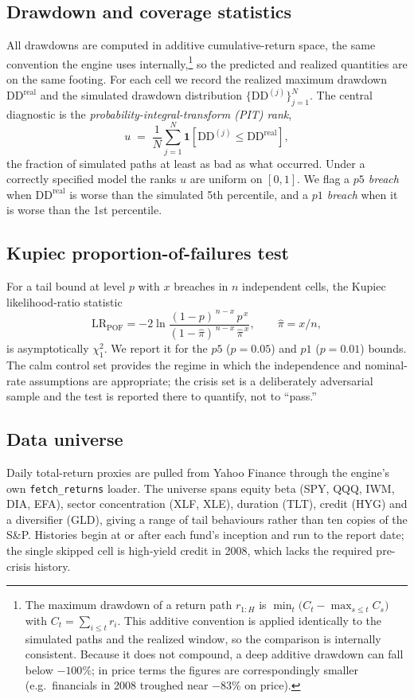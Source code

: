 \documentclass[11pt]{article}
\newcommand{\dd}{\mathrm{DD}}
\begin{document}
\subsection{Drawdown and coverage statistics}
All drawdowns are computed in additive cumulative-return space, the same
convention the engine uses internally,\footnote{The maximum drawdown of a
return path $r_{1:H}$ is $\min_t\big(C_t - \max_{s\le t} C_s\big)$ with
$C_t=\sum_{i\le t} r_i$. This additive convention is applied identically to the
simulated paths and the realized window, so the comparison is internally
consistent. Because it does not compound, a deep additive drawdown can fall
below $-100\%$; in price terms the figures are correspondingly smaller (e.g.\
financials in 2008 troughed near $-83\%$ on price).} so the predicted and
realized quantities are on the same footing. For each cell we record the
realized maximum drawdown $\dd^{\text{real}}$ and the simulated drawdown
distribution $\{\dd^{(j)}\}_{j=1}^{N}$. The central diagnostic is the
\emph{probability-integral-transform (PIT) rank},
\[
  u \;=\; \frac{1}{N}\sum_{j=1}^{N}\mathbf{1}\!\left[\dd^{(j)} \le \dd^{\text{real}}\right],
\]
the fraction of simulated paths at least as bad as what occurred. Under a
correctly specified model the ranks $u$ are uniform on $[0,1]$. We flag a
\emph{$p5$ breach} when $\dd^{\text{real}}$ is worse than the simulated
5th percentile, and a \emph{$p1$ breach} when it is worse than the 1st
percentile.

\subsection{Kupiec proportion-of-failures test}
For a tail bound at level $p$ with $x$ breaches in $n$ independent cells, the
Kupiec likelihood-ratio statistic
\[
  \mathrm{LR}_{\text{POF}}
  = -2\ln\!\frac{(1-p)^{\,n-x}\,p^{\,x}}
                {(1-\hat\pi)^{\,n-x}\,\hat\pi^{\,x}},
  \qquad \hat\pi = x/n,
\]
is asymptotically $\chi^2_1$. We report it for the $p5$ ($p=0.05$) and $p1$
($p=0.01$) bounds. The calm control set provides the regime in which the
independence and nominal-rate assumptions are appropriate; the crisis set is a
deliberately adversarial sample and the test is reported there to quantify, not
to ``pass.''

\subsection{Data universe}
Daily total-return proxies are pulled from Yahoo Finance through the engine's
own \texttt{fetch\_returns} loader. The universe spans equity beta (SPY, QQQ,
IWM, DIA, EFA), sector concentration (XLF, XLE), duration (TLT), credit (HYG)
and a diversifier (GLD), giving a range of tail behaviours rather than ten
copies of the S\&P. Histories begin at or after each fund's inception and run
to the report date; the single skipped cell is high-yield credit in 2008,
which lacks the required pre-crisis history.
\end{document}
